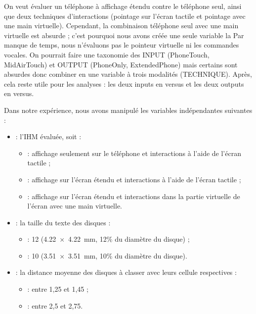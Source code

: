 On veut évaluer un téléphone à affichage étendu contre le téléphone seul, ainsi que deux techniques d'interactions (pointage sur l'écran tactile et pointage avec une main virtuelle). Cependant, la combinaison téléphone seul avec une main virtuelle est absurde ; c'est pourquoi nous avons créée une seule variable la   Par manque de temps, nous n'évaluons pas le pointeur virtuelle ni les commandes vocales.
On pourrait faire une taxonomie des INPUT (PhoneTouch, MidAirTouch) et OUTPUT (PhoneOnly, ExtendedPhone) mais certains sont absurdes donc combiner en une variable à trois modalités (TECHNIQUE). Après, cela reste utile pour les analyses : les deux inputs en versus et les deux outputs en versus.

Dans notre expérience, nous avons manipulé les variables indépendantes suivantes :
\begin{itemize}
  \item {} : l'IHM évaluée, soit :
  \begin{itemize}
    \item {} : affichage seulement sur le téléphone et interactions à l'aide de l'écran tactile ;
    \item {} : affichage sur l'écran étendu et interactions à l'aide de l'écran tactile ;
    \item {} : affichage sur l'écran étendu et interactions dans la partie virtuelle de l'écran avec une main virtuelle.
  \end{itemize}
  \item {} : la taille du texte des disques :
  \begin{itemize}
    \item {} : \SI{12}{\pt} (\SI{4.22x4.22}{\mm}, 12\% du diamètre du disque) ;
    \item {} : \SI{10}{\pt} (\SI{3.51x3.51}{\mm}, 10\% du diamètre du disque).
  \end{itemize}
  \item {} : la distance moyenne des disques à classer avec leurs cellule respectives :
  \begin{itemize}
    \item {} : entre 1,25 et 1,45 ;
    \item {} : entre 2,5 et 2,75.
  \end{itemize}
\end{itemize}

